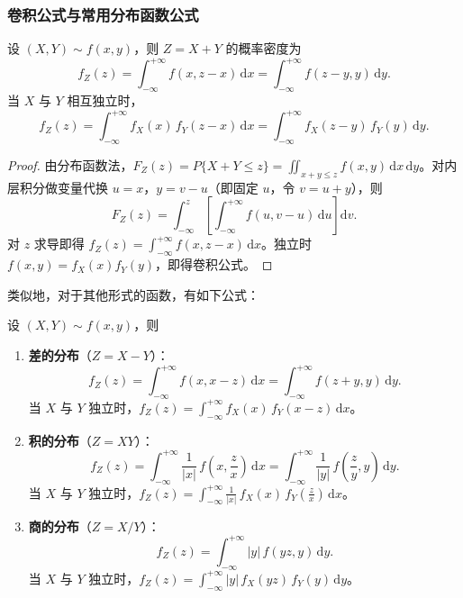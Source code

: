 \documentclass[lang=cn,11pt]{elegantbook}
\begin{document}
\subsubsection{卷积公式与常用分布函数公式}

\begin{theorem}[卷积公式] \label{thm:convolution}
设 $(X,Y) \sim f(x,y)$，则 $Z = X + Y$ 的概率密度为
\[
f_Z(z) = \int_{-\infty}^{+\infty}f(x, z-x)\,\mathrm{d}x = \int_{-\infty}^{+\infty}f(z-y, y)\,\mathrm{d}y.
\]
当 $X$ 与 $Y$ 相互独立时，
\[
f_Z(z) = \int_{-\infty}^{+\infty}f_X(x)\,f_Y(z-x)\,\mathrm{d}x = \int_{-\infty}^{+\infty}f_X(z-y)\,f_Y(y)\,\mathrm{d}y.
\]
\end{theorem}
\begin{proof}
由分布函数法，\(F_Z(z) = P\{X+Y \leqslant z\} = \iint_{x+y \leqslant z} f(x,y)\,\mathrm{d}x\,\mathrm{d}y\)。对内层积分做变量代换 \(u = x\)，\(y = v - u\)（即固定 \(u\)，令 \(v = u+y\)），则
\[
F_Z(z) = \int_{-\infty}^{z}\left[\int_{-\infty}^{+\infty} f(u, v-u)\,\mathrm{d}u\right]\mathrm{d}v.
\]
对 \(z\) 求导即得 \(f_Z(z) = \int_{-\infty}^{+\infty} f(x, z-x)\,\mathrm{d}x\)。独立时 \(f(x,y)=f_X(x)f_Y(y)\)，即得卷积公式。
\end{proof}

类似地，对于其他形式的函数，有如下公式：

\begin{property}[差、积、商的分布]\label{prop:diff-prod-quot-dist}
设 $(X,Y) \sim f(x,y)$，则
\begin{enumerate}
    \item \textbf{差的分布}（$Z = X - Y$）：
    \[
    f_Z(z) = \int_{-\infty}^{+\infty}f(x, x-z)\,\mathrm{d}x = \int_{-\infty}^{+\infty}f(z+y, y)\,\mathrm{d}y.
    \]
    当 $X$ 与 $Y$ 独立时，$f_Z(z) = \displaystyle\int_{-\infty}^{+\infty}f_X(x)\,f_Y(x-z)\,\mathrm{d}x$。

    \item \textbf{积的分布}（$Z = XY$）：
    \[
    f_Z(z) = \int_{-\infty}^{+\infty}\frac{1}{|x|}\,f\!\left(x, \frac{z}{x}\right)\,\mathrm{d}x = \int_{-\infty}^{+\infty}\frac{1}{|y|}\,f\!\left(\frac{z}{y}, y\right)\,\mathrm{d}y.
    \]
    当 $X$ 与 $Y$ 独立时，$f_Z(z) = \displaystyle\int_{-\infty}^{+\infty}\frac{1}{|x|}\,f_X(x)\,f_Y\!\left(\frac{z}{x}\right)\,\mathrm{d}x$。

    \item \textbf{商的分布}（$Z = X / Y$）：
    \[
    f_Z(z) = \int_{-\infty}^{+\infty}|y|\,f(yz, y)\,\mathrm{d}y.
    \]
    当 $X$ 与 $Y$ 独立时，$f_Z(z) = \displaystyle\int_{-\infty}^{+\infty}|y|\,f_X(yz)\,f_Y(y)\,\mathrm{d}y$。
\end{enumerate}
\end{property}
\end{document}

